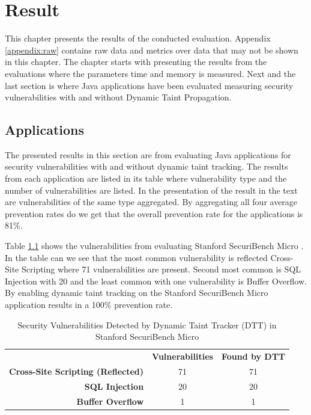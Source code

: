 \chapter{Result}
This chapter presents the results of the conducted evaluation. Appendix \ref{appendix:raw} contains raw data and metrics over data that may not be shown in this chapter. The chapter starts with presenting the results from the \textit{} evaluations where the parameters time and memory is measured. Next and the last section is \textit{} where Java applications have been evaluated measuring security vulnerabilities with and without Dynamic Taint Propagation.



\section{Applications}
\label{Applications}
The presented results in this section are from evaluating Java applications for security vulnerabilities with and without dynamic taint tracking. The results from each application are listed in its table where vulnerability type and the number of vulnerabilities are listed. In the presentation of the result in the text are vulnerabilities of the same type aggregated. By aggregating all four average prevention rates do we get that the overall prevention rate for the applications is 81\%.

Table \ref{table:MicroTable} shows the vulnerabilities from evaluating Stanford SecuriBench Micro \parencite{securiBenchMicro}. In the table can we see that the most common vulnerability is reflected Cross-Site Scripting where 71 vulnerabilities are present. Second most common is SQL Injection with 20 and the least common with one vulnerability is Buffer Overflow. By enabling dynamic taint tracking on the Stanford SecuriBench Micro \parencite{securiBenchMicro} application results in a 100\% prevention rate.

\begin{table}[H]
  \centering
  \caption{Security Vulnerabilities Detected by Dynamic Taint Tracker (DTT) in Stanford SecuriBench Micro}
  \label{table:MicroTable}
    \begin{tabular}{rcc}
      & \textbf{Vulnerabilities} & \textbf{Found by DTT} \\
      \textbf{Cross-Site Scripting (Reflected)} & 71            & 71  \\
      \textbf{SQL Injection}                    & 20            & 20  \\
      \textbf{Buffer Overflow}                  & 1             & 1  
    \end{tabular}
\end{table}


